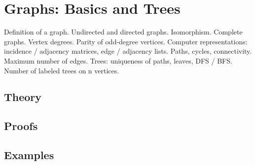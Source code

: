 
\section{Graphs: Basics and Trees}
\label{sec:2.2.08-graphs-basics}

\begin{ticket}
Definition of a graph. Undirected and directed graphs. Isomorphism. Complete graphs. Vertex degrees. Parity of odd-degree vertices. Computer representations: incidence / adjacency matrices, edge / adjacency lists. Paths, cycles, connectivity. Maximum number of edges. Trees: uniqueness of paths, leaves, DFS / BFS. Number of labeled trees on n vertices.
\end{ticket}

\subsection*{Theory}

\subsection*{Proofs}

\subsection*{Examples}
